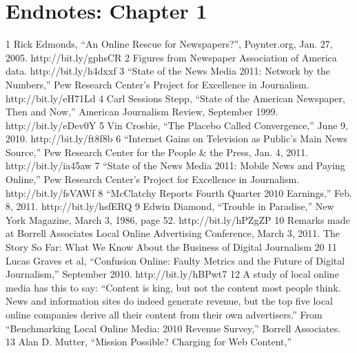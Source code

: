 \section{Endnotes: Chapter 1}
1 Rick Edmonds, ``An Online Rescue for Newspapers?'', Poynter.org, Jan. 27, 2005.
http://bit.ly/gphsCR
2 Figures from Newspaper Association of America data. http://bit.ly/h4dxxf
3 ``State of the News Media 2011: Network by the Numbers,'' Pew Research Center's Project
for Excellence in Journalism. http://bit.ly/eH71Ld
4 Carl Sessions Stepp, ``State of the American Newspaper, Then and Now,'' American Journalism
Review, September 1999. http://bit.ly/eDev0Y
5 Vin Crosbie, ``The Placebo Called Convergence,'' June 9, 2010. http://bit.ly/ft8f8b
6 ``Internet Gains on Television as Public's Main News Source,'' Pew Research Center for the
People & the Press, Jan. 4, 2011. http://bit.ly/ia45aw
7 ``State of the News Media 2011: Mobile News and Paying Online,'' Pew Research Center's
Project for Excellence in Journalism. http://bit.ly/fsVAWf
8 ``McClatchy Reports Fourth Quarter 2010 Earnings,'' Feb. 8, 2011. http://bit.ly/hsfERQ
9 Edwin Diamond, ``Trouble in Paradise,'' New York Magazine, March 3, 1986, page 52.
http://bit.ly/hPZgZP
10 Remarks made at Borrell Associates Local Online Advertising Conference, March 3, 2011.
The Story So Far: What We Know About the Business of Digital Journalism
20
11 Lucas Graves et al, ``Confusion Online: Faulty Metrics and the Future of Digital Journalism,''
September 2010. http://bit.ly/hBPwt7
12 A study of local online media has this to say: ``Content is king, but not the content most
people think. News and information sites do indeed generate revenue, but the top five local
online companies derive all their content from their own advertisers.'' From ``Benchmarking
Local Online Media: 2010 Revenue Survey,'' Borrell Associates.
13 Alan D. Mutter, ``Mission Possible? Charging for Web Content,''

